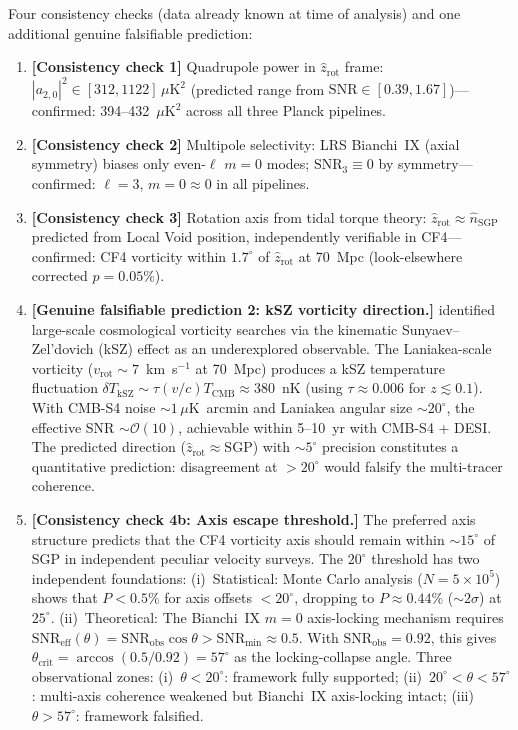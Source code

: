 \documentclass[12pt]{article}
\begin{document}
Four consistency checks (data already known at time of analysis) and one additional
genuine falsifiable prediction:

\begin{enumerate}
\item \textbf{[Consistency check 1]} Quadrupole power in $\hat{z}_\mathrm{rot}$
  frame: $|a_{2,0}|^2\in[312,1122]\,\mu\mathrm{K}^2$ (predicted range from
  $\mathrm{SNR}\in[0.39,1.67]$)---confirmed: 394--432~$\mu\mathrm{K}^2$ across
  all three Planck pipelines.

\item \textbf{[Consistency check 2]} Multipole selectivity: LRS Bianchi~IX (axial
  symmetry) biases only even-$\ell$ $m=0$ modes; $\mathrm{SNR}_3\equiv0$ by
  symmetry---confirmed: $\ell=3$, $m=0\approx0$ in all pipelines.

\item \textbf{[Consistency check 3]} Rotation axis from tidal torque theory:
  $\hat{z}_\mathrm{rot}\approx\hat{n}_\mathrm{SGP}$ predicted from Local Void
  position, independently verifiable in CF4---confirmed: CF4 vorticity within
  $1.7^\circ$ of $\hat{z}_\mathrm{rot}$ at 70~Mpc (look-elsewhere corrected
  $p=0.05\%$).

\item \textbf{[Genuine falsifiable prediction 2: kSZ vorticity direction.]}
  \citet{Coulton2023} identified large-scale cosmological vorticity searches
  via the kinematic Sunyaev--Zel'dovich (kSZ) effect as an underexplored
  observable. The Laniakea-scale vorticity ($v_\mathrm{rot}\sim7$~km~s$^{-1}$ at 70~Mpc)
  produces a kSZ temperature fluctuation
  $\delta T_\mathrm{kSZ}\sim\tau(v/c)T_\mathrm{CMB}\approx380$~nK
  (using $\tau\approx0.006$ for $z\lesssim0.1$).
  With CMB-S4 noise $\sim1\,\mu$K~arcmin and Laniakea angular size $\sim20^\circ$,
  the effective SNR $\sim\mathcal{O}(10)$, achievable within 5--10~yr with
  CMB-S4 + DESI.
  The predicted direction ($\hat{z}_\mathrm{rot}\approx\mathrm{SGP}$) with
  $\sim5^\circ$ precision constitutes a quantitative prediction: disagreement at
  $>20^\circ$ would falsify the multi-tracer coherence.

\item \textbf{[Consistency check 4b: Axis escape threshold.]}
  The preferred axis structure predicts that the CF4 vorticity axis should remain
  within $\sim15^\circ$ of SGP in independent peculiar velocity surveys.
  The $20^\circ$ threshold has two independent foundations:
  (i)~Statistical: Monte Carlo analysis ($N=5\times10^5$) shows that $P<0.5\%$
  for axis offsets $<20^\circ$, dropping to $P\approx0.44\%$ ($\sim2\sigma$) at
  $25^\circ$.
  (ii)~Theoretical: The Bianchi~IX $m=0$ axis-locking mechanism requires
  $\mathrm{SNR}_\mathrm{eff}(\theta)=\mathrm{SNR}_\mathrm{obs}\cos\theta>\mathrm{SNR}_{\min}\approx0.5$.
  With $\mathrm{SNR}_\mathrm{obs}=0.92$, this gives
  $\theta_\mathrm{crit}=\arccos(0.5/0.92)=57^\circ$ as the locking-collapse angle.
  Three observational zones:
  (i)~$\theta<20^\circ$: framework fully supported;
  (ii)~$20^\circ<\theta<57^\circ$: multi-axis coherence weakened but Bianchi~IX
  axis-locking intact;
  (iii)~$\theta>57^\circ$: framework falsified.


\end{enumerate}
\end{document}
